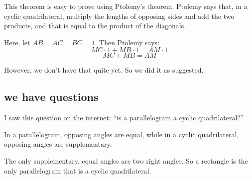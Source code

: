 \documentclass[11pt, oneside]{article}
\begin{document}
This theorem is easy to prove using Ptolemy's theorem.  Ptolemy says that, in a cyclic quadrilateral, multiply the lengths of opposing sides and add the two products, and that is equal to the product of the diagonals.

Here, let $AB = AC = BC = 1$.  Then Ptolemy says:
\[ MC \cdot 1 + MB \cdot 1 = AM \cdot 1 \]
\[ MC + MB = AM \]

However, we don't have that quite yet.  So we did it as suggested.

\subsection*{we have questions}

I saw this question on the internet:  ``is a parallelogram a cyclic quadrilateral?''

In a parallelogram, opposing angles are equal, while in a cyclic quadrilateral, opposing angles are supplementary.

The only supplementary, equal angles are two right angles.  So a rectangle is the only parallelogram that is a cyclic quadrilateral.
\end{document}

